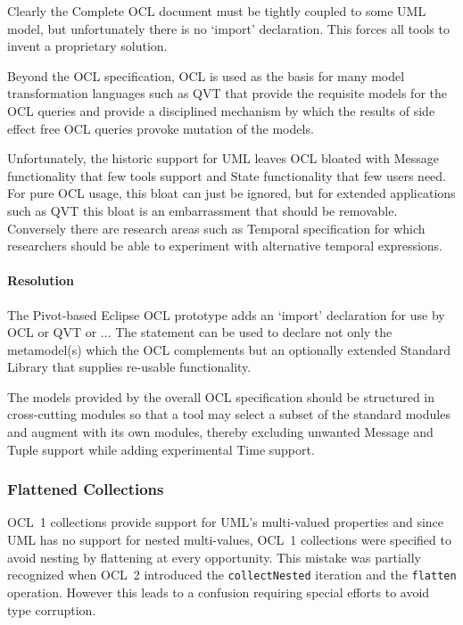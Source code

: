 \documentclass{jot}
\begin{document}
Clearly the Complete OCL document must be tightly coupled to some UML model, but unfortunately there is no `import' declaration. This forces all tools to invent a proprietary solution. 

Beyond the OCL specification, OCL is used as the basis for many model transformation languages such as QVT that provide the requisite models for the OCL queries and provide a disciplined mechanism by which the results of side effect free OCL queries provoke mutation of the models.

Unfortunately, the historic support for UML leaves OCL bloated with Message functionality that few tools support and State functionality that few users need. For pure OCL usage, this bloat can just be ignored, but for extended applications such as QVT this bloat is an embarrassment that should be removable. Conversely there are research areas such as Temporal specification for which researchers should be able to experiment with alternative temporal expressions.

\paragraph{Resolution}

The Pivot-based Eclipse OCL prototype adds an `import' declaration for use by OCL or QVT or ... The statement can be used to declare not only the metamodel(s) which the OCL complements but an optionally extended Standard Library that supplies re-usable functionality.

The models provided by the overall OCL specification should be structured in cross-cutting modules so that a tool may select a subset of the standard modules and augment with its own modules, thereby excluding unwanted Message and Tuple support while adding experimental Time support.

\subsubsection{Flattened Collections}

OCL~1 collections provide support for UML's multi-valued properties and since UML has no support for nested multi-values, OCL~1 collections were specified to avoid nesting by flattening at every opportunity. This mistake was partially recognized when OCL~2 introduced the \verb$collectNested$ iteration and the \verb$flatten$ operation. However this leads to a confusion requiring special efforts to avoid type corruption.
\end{document}
